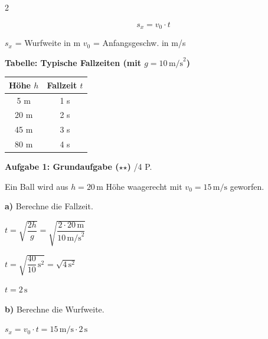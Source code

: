 \documentclass[10pt, a4paper]{article}
\newcommand{\fachfarbe}{physik}
\newcommand{\abschnitt}[1]{%
    \vspace{8pt}
    \noindent\textbf{\textcolor{\fachfarbe}{#1}}
    \vspace{4pt}
}
\newcommand{\punkte}[1]{\hfill\small\textcolor{grau}{/#1 P.}}
\newcommand{\stmark}{$\star$}
\begin{document}
\begin{multicols}{2}
\begin{formelbox}
\begin{equation*}
s_x = v_0 \cdot t
\end{equation*}

\vspace{2pt}
\small
$s_x$ = Wurfweite in m \quad $v_0$ = Anfangsgeschw. in m/s
\end{formelbox}

\vspace{6pt}


\abschnitt{Tabelle: Typische Fallzeiten (mit $g = 10\,\text{m/s}^2$)}

\begin{center}
\begin{tabular}{|c|c|}
\hline
\textbf{Höhe $h$} & \textbf{Fallzeit $t$} \\
\hline
5 m & 1 s \\
\hline
20 m & 2 s \\
\hline
45 m & 3 s \\
\hline
80 m & 4 s \\
\hline
\end{tabular}
\end{center}

\vspace{4pt}


\columnbreak

\abschnitt{Aufgabe 1: Grundaufgabe (\stmark\stmark)}\punkte{4}

Ein Ball wird aus $h = 20\,\text{m}$ Höhe waagerecht mit $v_0 = 15\,\text{m/s}$ geworfen.

\textbf{a)} Berechne die Fallzeit.

\vspace{4pt}
\textcolor{loesung}{
$t = \sqrt{\dfrac{2h}{g}} = \sqrt{\dfrac{2 \cdot 20\,\text{m}}{10\,\text{m/s}^2}}$

$t = \sqrt{\dfrac{40}{10}\,\text{s}^2} = \sqrt{4\,\text{s}^2}$

$\boxed{t = 2\,\text{s}}$
}

\vspace{6pt}

\textbf{b)} Berechne die Wurfweite.

\vspace{4pt}
\textcolor{loesung}{
$s_x = v_0 \cdot t = 15\,\text{m/s} \cdot 2\,\text{s}$

}
\end{multicols}
\end{document}
